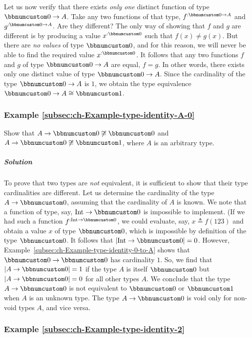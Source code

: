 Let us now verify that there exists \emph{only one} distinct function
of type $\bbnum 0\rightarrow A$. Take any two functions of that type,
$f^{:\bbnum 0\rightarrow A}$ and $g^{:\bbnum 0\rightarrow A}$. Are
they different? The only way of showing that $f$ and $g$ are different
is by producing a value $x^{:\bbnum 0}$ such that $f(x)\neq g(x)$.
But there are \emph{no} \emph{values} of type $\bbnum 0$, and for
this reason, we will never be able to find the required value $x^{:\bbnum 0}$.
It follows that any two functions $f$ and $g$ of type $\bbnum 0\rightarrow A$
are equal, $f=g$. In other words, there exists only one distinct
value of type $\bbnum 0\rightarrow A$. Since the cardinality of the
type $\bbnum 0\rightarrow A$ is $1$, we obtain the type equivalence
$\bbnum 0\rightarrow A\cong\bbnum 1$.

\subsubsection{Example \label{subsec:ch-Example-type-identity-A-0}\ref{subsec:ch-Example-type-identity-A-0}}

Show that $A\rightarrow\bbnum 0\not\cong\bbnum 0$ and $A\rightarrow\bbnum 0\not\cong\bbnum 1$,
where $A$ is an arbitrary type.

\subparagraph{Solution}

To prove that two types are \emph{not} equivalent, it is sufficient
to show that their type cardinalities are different. Let us determine
the cardinality of the type $A\rightarrow\bbnum 0$, assuming that
the cardinality of $A$ is known. We note that a function of type,
say, $\text{Int}\rightarrow\bbnum 0$ is impossible to implement.
(If we had such a function $f^{:\text{Int}\rightarrow\bbnum 0}$,
we could evaluate, say, $x\triangleq f(123)$ and obtain a value $x$
of type $\bbnum 0$, which is impossible by definition of the type
$\bbnum 0$. It follows that $\left|\text{Int}\rightarrow\bbnum 0\right|=0$.
However, Example~\ref{subsec:ch-Example-type-identity-0-to-A} shows
that $\bbnum 0\rightarrow\bbnum 0$ has cardinality $1$. So, we find
that $\left|A\rightarrow\bbnum 0\right|=1$ if the type $A$ is itself
$\bbnum 0$ but $\left|A\rightarrow\bbnum 0\right|=0$ for all other
types $A$. We conclude that the type $A\rightarrow\bbnum 0$ is not
equivalent to $\bbnum 0$ or $\bbnum 1$ when $A$ is an unknown type.
The type $A\rightarrow\bbnum 0$ is void only for non-void types $A$,
and vice versa.

\subsubsection{Example \label{subsec:ch-Example-type-identity-2}\ref{subsec:ch-Example-type-identity-2}}

